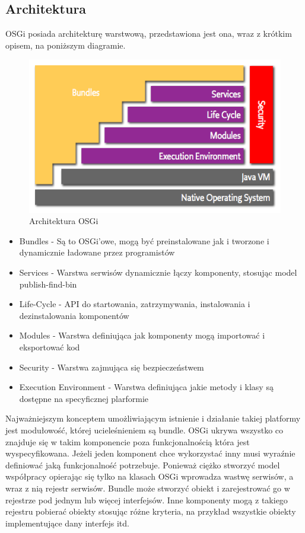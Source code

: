 \subsection{Architektura}
OSGi posiada architekturę warstwową, przedstawiona jest ona, wraz z krótkim opisem, na poniższym diagramie.
\newpage
\begin{figure}[!h]
	\centering
	\includegraphics[scale=0.65]{osgiArchitektura.png} 
	\caption{Architektura OSGi}
\end{figure}
\begin{itemize}
	\item Bundles - Są to OSGi'owe, mogą być preinstalowane jak i tworzone i dynamicznie ładowane przez programistów
	\item Services - Warstwa serwisów dynamicznie łączy komponenty, stosując model publish-find-bin
	\item Life-Cycle - API do startowania, zatrzymywania, instalowania i dezinstalowania komponentów
	\item Modules - Warstwa definiująca jak komponenty mogą importować i eksportować kod	
	\item Security - Warstwa zajmująca się bezpieczeństwem
	\item Execution Environment - Warstwa definiująca jakie metody i klasy są dostępne na specyficznej plarformie
\end{itemize}  
Najważniejszym konceptem umożliwiającym istnienie i działanie takiej platformy jest modułowość, której ucieleśnieniem są bundle. OSGi ukrywa wszystko co znajduje się w takim komponencie poza funkcjonalnością która jest wyspecyfikowana. Jeżeli jeden komponent chce wykorzystać inny musi wyraźnie definiować jaką funkcjonalność potrzebuje. Ponieważ ciężko stworzyć model współpracy opierając się tylko na klasach OSGi wprowadza wastwę serwisów, a wraz z nią rejestr serwisów. Bundle może stworzyć obiekt i zarejestrować go w rejestrze pod jednym lub więcej interfejsów. Inne komponenty mogą z takiego rejestru pobierać obiekty stosując różne kryteria, na przykład wszystkie obiekty implementujące dany interfejs itd.
